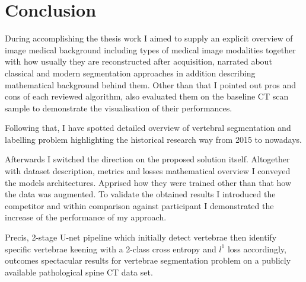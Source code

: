 \chapter{Conclusion}
\label{ch:conclusion}
During accomplishing the thesis work I aimed to supply an explicit overview of image medical background including types of medical image modalities together with how usually they are reconstructed after acquisition, narrated about classical and modern segmentation approaches in addition describing mathematical background behind them. Other than that I pointed out pros and cons of each reviewed algorithm, also evaluated them on the baseline CT scan sample to demonstrate the visualisation of their performances. 

Following that, I have spotted detailed overview of vertebral segmentation and labelling problem highlighting the historical research way from 2015 to nowadays.  

Afterwards I switched the direction on the proposed solution itself. Altogether with dataset description, metrics and losses mathematical overview I conveyed the models architectures. Apprised how they were trained other than that how the data was augmented. To validate the obtained results I introduced the competitor and within comparison against participant I demonstrated the increase of the performance of my approach.

Precis, 2-stage U-net pipeline which initially detect vertebrae then identify specific vertebrae keening with a 2-class cross entropy and $l^{1}$ loss accordingly, outcomes spectacular results for vertebrae segmentation problem on a publicly available pathological spine CT data set. 